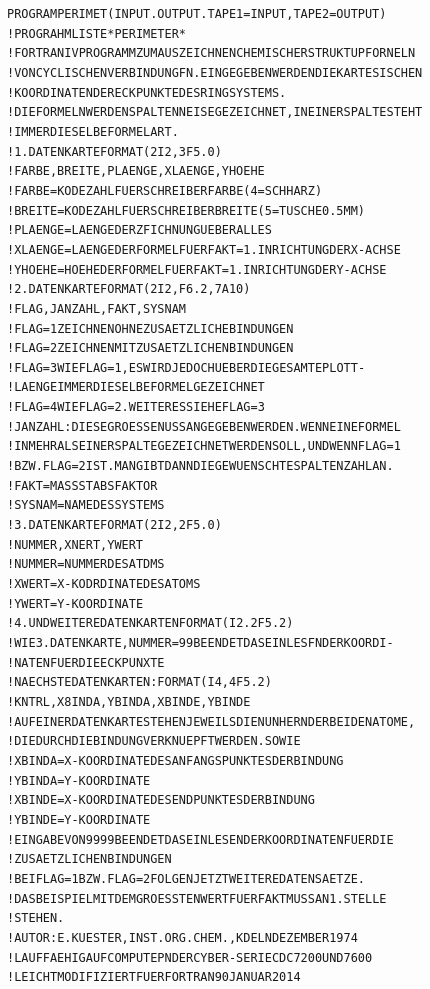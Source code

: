 \documentclass[a4paper,11pt]{article}
\begin{document}
\begin{alltt}
\newpage
{}

      PROGRAM PERIMET (INPUT.OUTPUT.TAPE1=INPUT,TAPE2=OUTPUT)
!     PROGRAHMLISTE *PERIMETER*
!     FORTRAN IV PROGRAMM ZUM AUSZEICHNEN CHEMISCHER STRUKTUPFORNELN
!     VON CYCLISCHEN VERBINDUNGFN. EINGEGEBEN WERDEN DIE KARTESISCHEN
!     KOORDINATEN DER ECKPUNKTE DES RINGSYSTEMS.
!     DIE FORMELN WERDEN SPALTENNEISE GEZEICHNET, IN EINER SPALTE STEHT
!     IMMER DIESELBE FORMELART.
!     1. DATENKARTE FORMAT (2I2,3F5.0)
!       FARBE,BREITE,PLAENGE,XLAENGE,YHOEHE
!       FARBE = KODEZAHL FUER SCHREIBERFARBE (4=SCHHARZ)
!       BREITE = KODEZAHL FUER SCHREIBERBREITE (5=TUSCHE 0.5 MM)
!       PLAENGE = LAENGE DER ZFICHNUNG UEBER ALLES
!       XLAENGE = LAENGE DER FORMEL FUER FAKT = 1. IN RICHTUNG DER X-ACHSE
!       YHOEHE = HOEHE DER FORMEL FUER FAKT = 1. IN RICHTUNG DER Y-ACHSE
!     2. DATENKARTE FORMAT (2I2,F6.2,7A10)
!       FLAG,JANZAHL,FAKT,SYSNAM
!       FLAG = 1 ZEICHNEN OHNE ZUSAETZLICHE BINDUNGEN
!       FLAG = 2 ZEICHNEN MIT ZUSAETZLICHEN BINDUNGEN
!       FLAG = 3 WIE FLAG = 1, ES WIRD JEDOCH UEBER DIE GESAMTE PLOTT-
!         LAENGE IMMER DIESELBE FORMEL GEZEICHNET
!     FLAG = 4 WIE FLAG = 2. WEITERES SIEHE FLAG = 3
!     JANZAHL: DIESE GROESSE NUSS ANGEGEBEN WERDEN. WENN EINE FORMEL
!     IN MEHR ALS EINER SPALTE GEZEICHNET WERDEN SOLL, UND WENN FLAG=1
!     BZW. FLAG=2 IST. MAN GIBT DANN DIE GEWUENSCHTE SPALTENZAHL AN.
!     FAKT = MASSSTABSFAKTOR
!     SYSNAM = NAME DES SYSTEMS
!     3. DATENKARTE FORMAT (2I2,2F5.0)
!        NUMMER,XNERT,YWERT
!       NUMMER = NUMMER DES ATDMS
!       XWERT = X-KODRDINATE DES ATOMS
!       YWERT = Y-KOORDINATE
!     4. UND WEITERE DATENKARTEN FORMAT (I2.2F5.2)
!       WIE 3. DATENKARTE, NUMMER = 99 BEENDET DAS EINLESFN DER KOORDI-
!       NATEN FUER DIE ECKPUNXTE
!     NAECHSTE DATENKARTEN: FORMAT (I4,4F5.2)
!        KNTRL,X8INDA,YBINDA,XBINDE,YBINDE
!       AUF EINER DATENKARTE STEHEN JEWEILS DIE NUNHERN DER BEIDEN ATOME,
!       DIE DURCH DIE BINDUNG VERKNUEPFT WERDEN. SOWIE
!       XBINDA = X-KOORDINATE DES ANFANGSPUNKTES DER BINDUNG
!       YBINDA = Y-KOORDINATE
!       XBINDE = X-KOORDINATE DES ENDPUNKTES DER BINDUNG
!       YBINDE = Y-KOORDINATE
!       EINGABE VON 9999 BEENDET DAS EINLESEN DER KOORDINATEN FUER DIE
!       ZUSAETZLICHEN BINDUNGEN
!     BEI FLAG=1 BZW. FLAG=2 FOLGEN JETZT WEITERE DATENSAETZE.
!     DAS BEISPIEL MIT DEM GROESSTEN WERT FUER FAKT MUSS AN 1. STELLE
!     STEHEN.
!     AUTOR: E.KUESTER, INST.ORG.CHEM., KDELN DEZEMBER 1974
!     LAUFFAEHIG AUF COMPUTEPN DER CYBER-SERIE CDC 7200 UND 7600
!     LEICHT MODIFIZIERT FUER FORTRAN90 JANUAR 2014    


\end{alltt}
\end{document}
